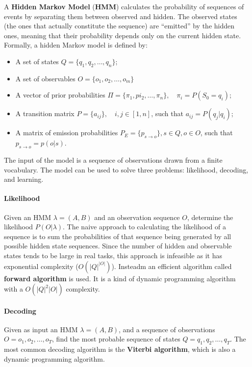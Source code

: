 A \textbf{Hidden Markov Model} (\textbf{HMM}) calculates the probability of sequences of events by separating them between observed and hidden. The observed states (the ones that actually constitute the sequence) are ``emitted'' by the hidden ones, meaning that their probability depends only on the current hidden state. Formally, a hidden Markov model is defined by:
\begin{itemize}[noitemsep]
    \item A set of states $Q = \{q_1, q_2, \dots, q_n\}$;
    \item A set of observables $O = \{o_1, o_2, \dots, o_m\}$
    \item A vector of prior probabilities $\Pi = \{\pi_1, pi_2, \dots, \pi_n\}, \quad \pi_i = P(S_0 = q_i)$;
    \item A transition matrix $P = \{ a_{ij} \}, \quad i,j \in [1,n]$, such that $a_{ij} = P(q_j|q_i)$;
    \item A matrix of emission probabilities $P_E = \{p_{s\rightarrow o}\}, s \in Q, o \in O$, such that $p_{s \rightarrow o} = p(o|s)$.
\end{itemize}
The input of the model is a sequence of observations drawn from a finite vocabulary. The model can be used to solve three problems: likelihood, decoding, and learning.

\paragraph{Likelihood} Given an HMM $\lambda=(A,B)$ and an observation sequence $O$, determine the likelihood $P(O|\lambda)$. The naive approach to calculating the likelihood of a sequence is to sum the probabilities of that sequence being generated by all possible hidden state sequences. Since the number of hidden and observable states tends to be large in real tasks, this approach is infeasible as it has exponential complexity ($O(|Q|^{|O|})$). Insteadm an efficient algorithm called \textbf{forward algorithm} is used. It is a kind of dynamic programming algorithm with a $O(|Q|^2 |O|)$ complexity.

\paragraph{Decoding} Given as input an HMM $\lambda = (A,B)$, and a sequence of observations $O=o_1, o_2, \dots, o_T$, find the most probable sequence of states  $Q = q_1, q_2, \dots, q_T$. The most common decoding algorithm is the \textbf{Viterbi algorithm}, which is also a dynamic programming algorithm.

